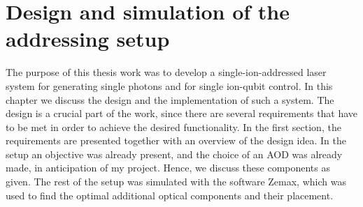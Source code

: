 \chapter{Design and simulation of the addressing setup}
The purpose of this thesis work was to develop a single-ion-addressed laser system for generating single photons and for single ion-qubit control. In this chapter we discuss the design and the implementation of such a system. The design is a crucial part of the work, since there are several requirements that have to be met in order to achieve the desired functionality. In the first section, the requirements are presented together with an overview of the design idea. In the setup an objective was already present, and the choice of an AOD was already made, in anticipation of my project. Hence, we discuss these components as given. The rest of the setup was simulated with the software Zemax, which was used to find the optimal additional optical components and their placement.
